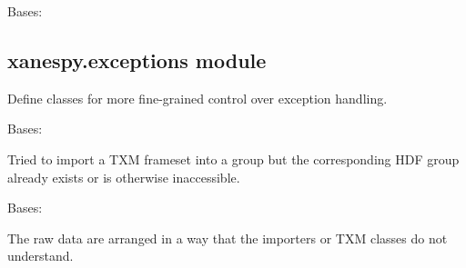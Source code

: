 \documentclass[letterpaper,10pt,english]{sphinxmanual}
\begin{document}

\begin{fulllineitems}
\label{\detokenize{xanespy:xanespy.edges.NMCNickelKEdge29}}
Bases: {\hyperref[\detokenize{xanespy:xanespy.edges.NCANickelKEdge}]{}}

\begin{fulllineitems}
\label{\detokenize{xanespy:xanespy.edges.NMCNickelKEdge29.regions}}
\end{fulllineitems}


\end{fulllineitems}



\subsection{xanespy.exceptions module}
\label{\detokenize{xanespy:xanespy-exceptions-module}}\label{\detokenize{xanespy:module-xanespy.exceptions}}
Define classes for more fine-grained control over exception
handling.

\begin{fulllineitems}
\label{\detokenize{xanespy:xanespy.exceptions.CreateGroupError}}
Bases: 

Tried to import a TXM frameset into a group but the corresponding
HDF group already exists or is otherwise inaccessible.

\end{fulllineitems}


\begin{fulllineitems}
\label{\detokenize{xanespy:xanespy.exceptions.DataFormatError}}
Bases: 

The raw data are arranged in a way that the importers or TXM classes do
not understand.

\end{fulllineitems}
\end{document}

